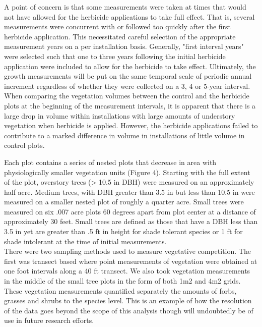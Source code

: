 \documentclass[11pt, letterpaper, fleqn]{article}
\begin{document}
A point of concern is that some measurements were taken at times that would not have allowed for the herbicide applications to take full effect. That is, several measurements were concurrent with or followed too quickly after the first herbicide application.  This necessitated careful selection of the appropriate measurement years on a per installation basis. Generally, "first interval years" were selected such that one to three years following the initial herbicide application were included to allow for the herbicide to take effect. Ultimately, the growth measurements will be put on the same temporal scale of periodic annual increment regardless of whether they were collected on a 3, 4 or 5-year interval. \\[2pt]


When comparing the vegetation volumes between the control and the herbicide plots at the beginning of the measurement intervals, it is apparent that there is a large drop in volume within installations with large amounts of understory vegetation when herbicide is applied. However, the herbicide applications failed to contribute to a marked difference in volume in installations of little volume in control plots.

Each plot contains a series of nested plots that decrease in area with physiologically smaller vegetation units (Figure 4). Starting with the full extent of the plot, overstory trees (> 10.5 in DBH) were measured on an approximately half acre. Medium trees, with DBH greater than 3.5 in but less than 10.5 in were measured on a smaller nested plot of roughly a quarter acre.
Small trees were measured on six .007 acre plots 60 degrees apart from plot center at a distance of approximately 30 feet.  Small trees are defined as those that have a DBH less than 3.5 in yet are greater than .5 ft in height for shade tolerant species or 1 ft for shade intolerant at the time of initial measurements.\\[2pt]

There were two sampling methods used to measure vegetative competition. The first was transect based where point measurements of vegetation were obtained at one foot intervals along a 40 ft transect.  We also took vegetation measurements in the middle of the small tree plots in the form of both 1m2 and 4m2 grids. These vegetation measurements quantified separately the amounts of forbs, grasses and shrubs to the species level.  This is an example of how the resolution of the data goes beyond the scope of this analysis though will undoubtedly be of use in future research efforts.\\[2pt]
\end{document}
